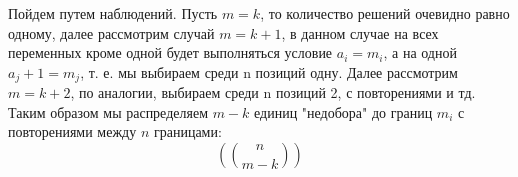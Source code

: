 Пойдем путем наблюдений. Пусть $m=k$, то количество решений очевидно равно одному, далее рассмотрим случай $m=k+1$, в данном случае на всех переменных кроме одной будет выполняться условие $a_i = m_i$, а на одной $a_j + 1 = m_j$, т. е. мы выбираем среди n позиций одну. Далее рассмотрим $m=k+2$, по аналогии, выбираем среди n позиций 2, с повторениями и тд. Таким образом мы распределяем $m-k$ единиц "недобора" до границ $m_i$ с повторениями между $n$ границами:
\[
	\left(\binom{n}{m-k}\right)
\] 
